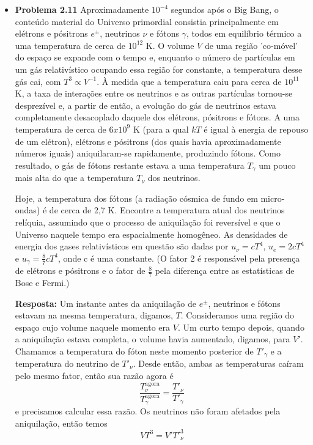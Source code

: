 \documentclass[12pt]{article}
\begin{document}
\begin{itemize}
\item \textbf{Problema 2.11} Aproximadamente $10^{-4}$ segundos após o Big Bang, o conteúdo material do Universo primordial consistia principalmente em elétrons e pósitrons $e^{\pm }$, neutrinos $\nu$ e fótons $\gamma$, todos em equilíbrio térmico a uma temperatura de cerca de $10^{12}$ K. O volume $V$ de uma região 'co-móvel' do espaço se expande com o tempo e, enquanto o número de partículas em um gás relativístico ocupando essa região for constante, a temperatura desse gás cai, com $T^3 \propto V^{-1}$. À medida que a temperatura caiu para cerca de $10^{11}$ K, a taxa de interações entre os neutrinos e as outras partículas tornou-se desprezível e, a partir de então, a evolução do gás de neutrinos estava completamente desacoplado daquele dos elétrons, pósitrons e fótons. A uma temperatura de cerca de $6 x 10^{9}$ K (para a qual $kT$ é igual à energia de repouso de um elétron), elétrons e pósitrons (dos quais havia aproximadamente números iguais) aniquilaram-se rapidamente, produzindo fótons. Como resultado, o gás de fótons restante estava a uma temperatura $T_\gamma$ um pouco mais alta do que a temperatura $T_\nu$ dos neutrinos.

Hoje, a temperatura dos fótons (a radiação cósmica de fundo em micro-ondas) é de cerca de 2,7 K. Encontre a temperatura atual dos neutrinos relíquia, assumindo que o processo de aniquilação foi reversível e que o Universo naquele tempo era espacialmente homogêneo. As densidades de energia dos gases relativísticos em questão são dadas por $u_\nu = cT^4$, $u_e = 2cT^4$ e $u_\gamma = \frac{8}{7}cT^4$, onde c é uma constante. (O fator 2 é responsável pela presença de elétrons e pósitrons e o fator de $\frac{8}{7}$ pela diferença entre as estatísticas de Bose e Fermi.)

\textbf{Resposta:} Um instante antes da aniquilação de $e^{\pm }$, neutrinos e fótons estavam na mesma temperatura, digamos, $T$. Consideramos uma região do espaço cujo volume naquele momento era $V$. Um curto tempo depois, quando a aniquilação estava completa, o volume havia aumentado, digamos, para $V'$. Chamamos a temperatura do fóton neste momento posterior de $T'_\gamma$ e a temperatura do neutrino de $T'_\nu$. Desde então, ambas as temperaturas caíram pelo mesmo fator, então sua razão agora é
\[
\frac{T^\text{agora}_\nu}{T^\text{agora}_\gamma}=\frac{T'_\nu}{T'_\gamma}
\]
 e precisamos calcular essa razão.
 Os neutrinos não foram afetados pela aniquilação, então temos
\[
V T^3 = V' T'^3_\nu
\]


\end{itemize}
\end{document}
